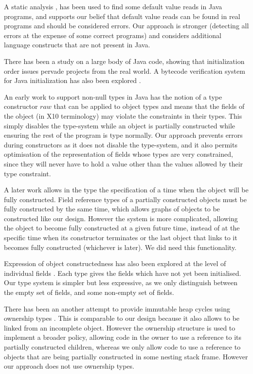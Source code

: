 A static analysis \cite{Seo:2007:SBD:1522565.1522587}, has been used to find
some default value reads in Java programs, and supports our belief that default
value reads can be found in real programs and should be considered errors.  Our
approach is stronger (detecting all errors at the expense of some correct
programs) and considers additional language constructs that are not present in
Java.

There has been a study on a large body \cite{Gil:2009:WRS:1615184.1615216} of
Java code, showing that initialization order issues pervade projects from the
real world.  A bytecode verification system for Java initialization has also
been explored \cite{Hubert:2010:ESO:1888881.1888890}.

An early work to support non-null types in Java
\cite{Fahndrich:2003:DCN:949305.949332} has the notion of a type constructor
$raw$ that can be applied to object types and means that the fields of the
object (in X10 terminology) may violate the constraints in their types.  This
simply disables the type-system while an object is partially constructed while
ensuring the rest of the program is type normally.  Our approach prevents
errors during constructors as it does not disable the type-system, and it also
permits optimisation of the representation of fields whose types are very
constrained, since they will never have to hold a value other than the values
allowed by their type constraint.

A later work \cite{Fahndrich:2007:EOI:1297027.1297052,XinQi:2009} allows in the
type the specification of a time when the object will be fully constructed.
Field reference types of a partially constructed objects must be fully
constructed by the same time, which allows graphs of objects to be constructed
like our  design.  However the system is more complicated, allowing
the object to become fully constructed at a given future time, instead of at
the specific time when its constructor terminates or the last object that links
to it becomes fully constructed (whichever is later).  We did need this
functionality.

Expression of object constructedness has also been explored at the level of
individual fields \cite{XinQi:2009}.  Each type gives the fields which have not
yet been initialised.  Our type system is simpler but less expressive, as we
only distinguish between the empty set of fields, and some non-empty set of
fields.

There has been an another attempt to provide immutable heap cycles using
ownership types \cite{Zibin:2010:OIG:1869459.1869509}.  This is comparable to
our  design because it also allows  to be linked from an
incomplete object.  However the ownership structure is used to implement a
broader policy, allowing code in the owner to use a reference to its partially
constructed children, whereas we only allow code to use a reference to objects
that are being partially constructed in some nesting stack frame.  However our
approach does not use ownership types.

